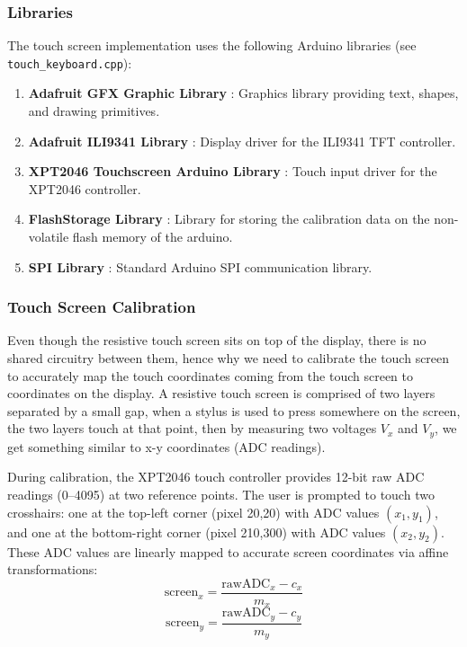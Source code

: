 \subsubsection{Libraries}
The touch screen implementation uses the following Arduino libraries (see \verb|touch_keyboard.cpp|):
\begin{enumerate}
    \item \textbf{Adafruit GFX Graphic Library} \cite{adafruit_gfx_library}: Graphics library providing text, shapes, and drawing primitives.
    \item \textbf{Adafruit ILI9341 Library} \cite{adafruit_ili9341}: Display driver for the ILI9341 TFT controller.
    \item \textbf{XPT2046 Touchscreen Arduino Library} \cite{xpt2046_touchscreen}: Touch input driver for the XPT2046 controller.
    \item \textbf{FlashStorage Library} \cite{flashstorage}: Library for storing the calibration data on the non-volatile flash memory of the arduino.
    \item \textbf{SPI Library} \cite{arduino_spi_reference}: Standard Arduino SPI communication library.
\end{enumerate}

\subsubsection{Touch Screen Calibration}
Even though the resistive touch screen sits on top of the display, there is no shared circuitry between them, hence why we need to calibrate the touch screen to accurately map the touch coordinates coming from the touch screen to coordinates on the display. A resistive touch screen is comprised of two layers separated by a small gap, when a stylus is used to press somewhere on the screen, the two layers touch at that point, then by measuring two voltages $V_x$ and $V_y$, we get something similar to x-y coordinates (ADC readings).

During calibration, the XPT2046 touch controller provides 12-bit raw ADC readings (0--4095) at two reference points. The user is prompted to touch two crosshairs: one at the top-left corner (pixel 20,20) with ADC values $(x_1, y_1)$, and one at the bottom-right corner (pixel 210,300) with ADC values $(x_2, y_2)$. These ADC values are linearly mapped to accurate screen coordinates via affine transformations: 
$$\text{screen}_x = \frac{\text{rawADC}_x - c_x}{m_x}$$
$$\text{screen}_y = \frac{\text{rawADC}_y - c_y}{m_y}$$


